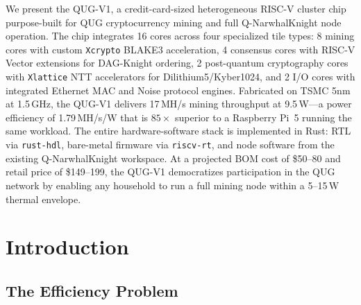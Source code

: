 \documentclass[11pt,a4paper]{article}
\begin{document}
\begin{titlepage}

\vspace{1cm}

\begin{tcolorbox}[colback=blue!5,colframe=qnkblue,title=\textbf{Abstract}]
We present the QUG-V1, a credit-card-sized heterogeneous RISC-V cluster chip purpose-built for QUG cryptocurrency mining and full Q-NarwhalKnight node operation. The chip integrates 16 cores across four specialized tile types: 8 mining cores with custom \texttt{Xcrypto} BLAKE3 acceleration, 4 consensus cores with RISC-V Vector extensions for DAG-Knight ordering, 2 post-quantum cryptography cores with \texttt{Xlattice} NTT accelerators for Dilithium5/Kyber1024, and 2 I/O cores with integrated Ethernet MAC and Noise protocol engines. Fabricated on TSMC 5nm at 1.5\,GHz, the QUG-V1 delivers 17\,MH/s mining throughput at 9.5\,W---a power efficiency of 1.79\,MH/s/W that is $85\times$ superior to a Raspberry Pi~5 running the same workload. The entire hardware-software stack is implemented in Rust: RTL via \texttt{rust-hdl}, bare-metal firmware via \texttt{riscv-rt}, and node software from the existing Q-NarwhalKnight workspace. At a projected BOM cost of \$50--80 and retail price of \$149--199, the QUG-V1 democratizes participation in the QUG network by enabling any household to run a full mining node within a 5--15\,W thermal envelope.
\end{tcolorbox}

\vfill
\end{titlepage}

\tableofcontents
\newpage

\section{Introduction}
\label{sec:introduction}

\subsection{The Efficiency Problem}
\end{document}
